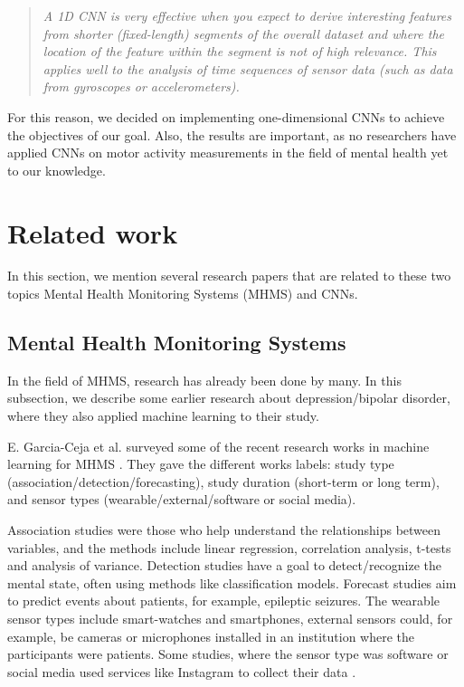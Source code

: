 \begin{quote}
\textit{A 1D CNN is very effective when you expect to derive interesting features from shorter (fixed-length) segments of the overall dataset and where the location of the feature within the segment is not of high relevance. This applies well to the analysis of time sequences of sensor data (such as data from gyroscopes or accelerometers).} \cite{1d_cnn}
\end{quote}

For this reason, we decided on implementing one-dimensional CNNs to achieve the objectives of our goal. Also, the results are important, as no researchers have applied CNNs on motor activity measurements in the field of mental health yet to our knowledge. 

\section{Related work}
In this section, we mention several research papers that are related to these two topics Mental Health Monitoring Systems (MHMS) and CNNs.

\subsection{Mental Health Monitoring Systems}
In the field of MHMS, research has already been done by many. In this subsection, we describe some earlier research about depression/bipolar disorder, where they also applied machine learning to their study. 

E. Garcia-Ceja et al. surveyed some of the recent research works in machine learning for MHMS \cite{GarciaCeja2018_survey}. They gave the different works labels: study type (association/detection/forecasting), study duration (short-term or long term), and sensor types (wearable/external/software or social media). 

Association studies were those who help understand the relationships between variables, and the methods include linear regression, correlation analysis, t-tests and analysis of variance. Detection studies have a goal to detect/recognize the mental state, often using methods like classification models. Forecast studies aim to predict events about patients, for example, epileptic seizures. The wearable sensor types include smart-watches and smartphones, external sensors could, for example, be cameras or microphones installed in an institution where the participants were patients. Some studies, where the sensor type was software or social media used services like Instagram to collect their data \cite{GarciaCeja2018_survey}. 

